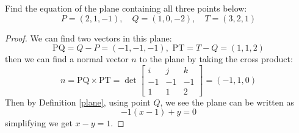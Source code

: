 \documentclass[openany]{book}
\begin{document}
\begin{prob}
    Find the equation of the plane containing all three points below:
    \begin{equation*}
        P=(2,1,-1), \quad Q=(1,0,-2), \quad T=(3,2,1)
    \end{equation*}
\end{prob}
\begin{proof}
    We can find two vectors in this plane:
    \begin{equation*}
        \text{PQ}=Q-P=(-1,-1,-1), \text{ PT}=T-Q=(1,1,2)
    \end{equation*}
    then we can find a normal vector $n$ to the plane by taking the cross product:
    \begin{equation*}
        n=\text{PQ}\times\text{PT}=\det\begin{bmatrix}
            i&j&k\\
            -1&-1&-1\\
            1&1&2
        \end{bmatrix}=(-1,1,0)
    \end{equation*}
    Then by Definition \ref{plane}, using point $Q$, we see the plane can be written as 
    \begin{equation*}
        -1(x-1)+y=0
    \end{equation*}
    simplifying we get $x-y=1$.
\end{proof}
\end{document}
